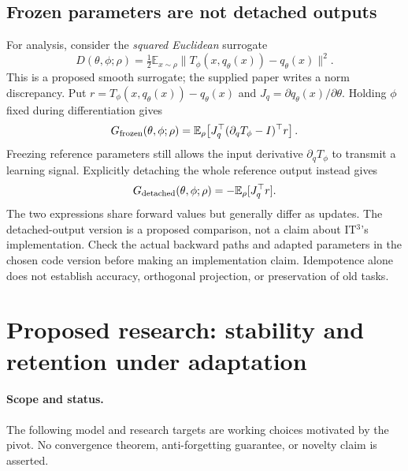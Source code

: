 \documentclass[11pt,a4paper]{article}
\newcommand{\E}{\mathbb{E}}
\begin{document}
\subsection{Frozen parameters are not detached outputs}
For analysis, consider the \emph{squared Euclidean} surrogate
\begin{equation}
 D(\theta,\phi;\rho)
 =\tfrac12\E_{x\sim\rho}
 \bigl\|T_\phi(x,q_\theta(x))-q_\theta(x)\bigr\|^2.
 \label{eq:it3surrogate}
\end{equation}
This is a proposed smooth surrogate; the supplied paper writes a norm
discrepancy. Put $r=T_\phi(x,q_\theta(x))-q_\theta(x)$ and
$J_q=\partial q_\theta(x)/\partial\theta$. Holding $\phi$ fixed during
differentiation gives
\begin{equation}
 G_{\rm frozen}(\theta,\phi;\rho)
 =\E_\rho\!\left[J_q^\top(\partial_q T_\phi-I)^\top r\right].
 \label{eq:frozen}
\end{equation}
Freezing reference parameters still allows the input derivative
$\partial_q T_\phi$ to transmit a learning signal.
Explicitly detaching the whole reference output instead gives
\begin{equation}
 G_{\rm detached}(\theta,\phi;\rho)=-\E_\rho[J_q^\top r].
 \label{eq:detached}
\end{equation}
The two expressions share forward values but generally differ as updates.
The detached-output version is a proposed comparison, not a claim about
IT$^3$'s implementation. Check the actual backward paths and adapted parameters
in the chosen code version before making an implementation claim.
Idempotence alone does not establish accuracy, orthogonal projection, or
preservation of old tasks.

\section{Proposed research: stability and retention under adaptation}
\label{sec:research}
\paragraph{Scope and status.}
The following model and research targets are working choices motivated by
the pivot. No convergence theorem, anti-forgetting guarantee, or novelty
claim is asserted.
\end{document}
